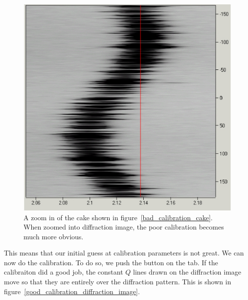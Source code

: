\begin{figure}
    \centering
    \includegraphics[scale=.75]{figures/bad_calibration_cake_zoom.eps}
    \caption{A zoom in of the cake shown in 
    figure~\ref{bad_calibration_cake}. When zoomed into 
    diffraction image, the poor calibration becomes much 
    more obvious.}
    \label{bad_calibration_cake_zoom}
\end{figure}

This means that our initial guess at 
calibration parameters is not great.
We can now do the calibration. To do so, we push
the  button on the 
tab. If the calibraiton did a good job, the constant
$Q$ lines drawn on the diffraction image move
so that they are entirely over the diffraction 
pattern. This is shown in 
figure~\ref{good_calibration_diffraction_image}.

